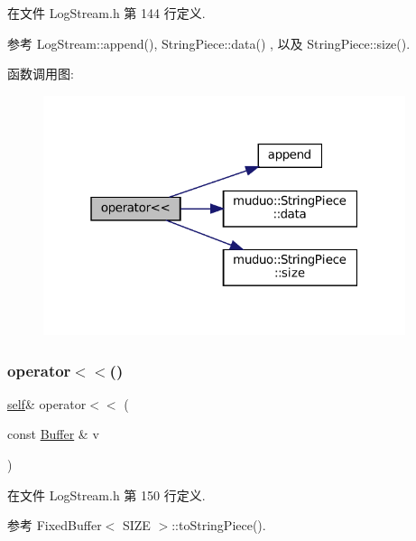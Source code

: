 在文件 Log\+Stream.\+h 第 144 行定义.



参考 Log\+Stream\+::append(), String\+Piece\+::data() , 以及 String\+Piece\+::size().

函数调用图\+:
\nopagebreak
\begin{figure}[H]
\begin{center}
\leavevmode
\includegraphics[width=301pt]{classmuduo_1_1LogStream_ae05e1c88b77ce178b75cb47185fd4894_cgraph}
\end{center}
\end{figure}
\mbox{\label{classmuduo_1_1LogStream_a2113666d07badb201263a185c1186132}} 
\subsubsection{\texorpdfstring{operator$<$$<$()}{operator<<()}\hspace{0.1cm}{\footnotesize\ttfamily [18/18]}}
{\footnotesize\ttfamily \hyperlink{classmuduo_1_1LogStream_a85e87a809801549b949fc3f7f8c816bd}{self}\& operator$<$$<$ (\begin{DoxyParamCaption}\item[{const \hyperlink{classmuduo_1_1LogStream_ad711cf53b5df9fac2d62ecd2b9a8f763}{Buffer} \&}]{v }\end{DoxyParamCaption})\hspace{0.3cm}{\ttfamily [inline]}}



在文件 Log\+Stream.\+h 第 150 行定义.



参考 Fixed\+Buffer$<$ S\+I\+Z\+E $>$\+::to\+String\+Piece().


